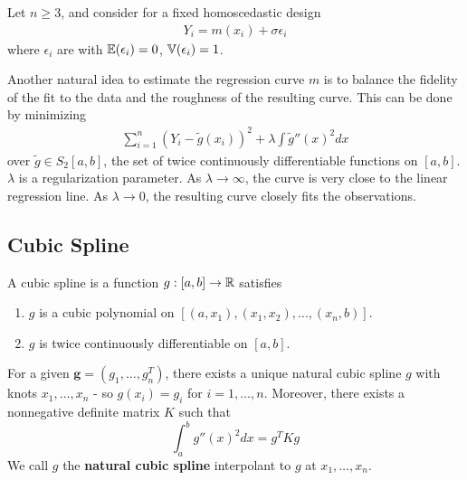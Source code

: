 Let $n \geq 3$, and consider for a fixed homoscedastic design
\begin{align}
  \label{eq:64}
  Y_{i} = m(x_{i}) + \sigma \epsilon_{i}
\end{align} where $\epsilon_{i}$ are \iid with $\E{\epsilon_{i}} = 0$,
$\Var{\epsilon_{i}} = 1$.

Another natural idea to estimate the regression curve $m$ is to
balance the fidelity of the fit to the data and the roughness of the
resulting curve.  This can be done by minimizing
\begin{align}
  \label{eq:65}
  \sum_{i=1}^{n} (Y_{i} - \tilde g(x_{i}))^{2} + \lambda \int \tilde
  g''(x)^{2} dx
\end{align} over $\tilde g \in S_{2}[a, b]$, the set of twice
continuously differentiable functions on $[a, b]$. $\lambda$ is a
regularization parameter. As $\lambda \rightarrow \infty$, the curve
is very close to the linear regression line. As $\lambda \rightarrow
0$, the resulting curve closely fits the observations.

\subsection{Cubic Spline}
\label{sec:cubic-spline}

\begin{defn}
  \label{defn:nonparametric_regression:2}
  A cubic spline is a function $g: [a, b] \rightarrow \mathbb{R}$ satisfies
  \begin{enumerate}
  \item $g$ is a cubic polynomial on $[(a, x_{1}), (x_{1}, x_{2}),
    \dots, (x_{n}, b)]$.
  \item $g$ is twice continuously differentiable on $[a, b]$.
  \end{enumerate}
\end{defn}

\begin{proposition}
  For a given $\mathbf{g} = (g_{1}, \dots, g_{n}^{T})$, there exists a unique
  natural cubic spline $g$ with knots $x_{1}, \dots, x_{n}$ - so
  $g(x_{i}) = g_{i}$ for $i = 1, \dots , n$.  Moreover, there exists a
  nonnegative definite matrix $K$ such that
  \begin{equation}
    \label{eq:59}
    \int_{a}^{b} g''(x)^{2}dx = g^{T}K g
  \end{equation}
  We call $g$ the \textbf{natural cubic spline} interpolant to $g$ at
  $x_{1}, \dots, x_{n}$.
\end{proposition}

